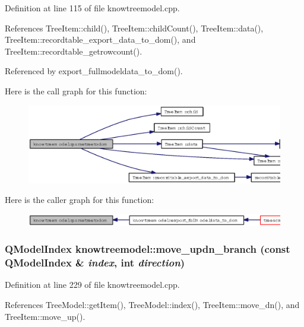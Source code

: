 Definition at line 115 of file knowtreemodel.cpp.

References Tree\-Item::child(), Tree\-Item::child\-Count(), Tree\-Item::data(), Tree\-Item::recordtable\_\-export\_\-data\_\-to\_\-dom(), and Tree\-Item::recordtable\_\-getrowcount().

Referenced by export\_\-fullmodeldata\_\-to\_\-dom().

Here is the call graph for this function:\begin{figure}[H]
\begin{center}
\leavevmode
\includegraphics[width=371pt]{classknowtreemodel_f0f1bf490bdc9687d25d72b966020cd8_cgraph}
\end{center}
\end{figure}


Here is the caller graph for this function:\begin{figure}[H]
\begin{center}
\leavevmode
\includegraphics[width=354pt]{classknowtreemodel_f0f1bf490bdc9687d25d72b966020cd8_icgraph}
\end{center}
\end{figure}
\subsubsection{\setlength{\rightskip}{0pt plus 5cm}QModel\-Index knowtreemodel::move\_\-updn\_\-branch (const QModel\-Index \& {\em index}, int {\em direction})\hspace{0.3cm}{\tt  [private]}}\label{classknowtreemodel_6d0493ddfa7010baf5bd713a6f0a8a11}




Definition at line 229 of file knowtreemodel.cpp.

References Tree\-Model::get\-Item(), Tree\-Model::index(), Tree\-Item::move\_\-dn(), and Tree\-Item::move\_\-up().

